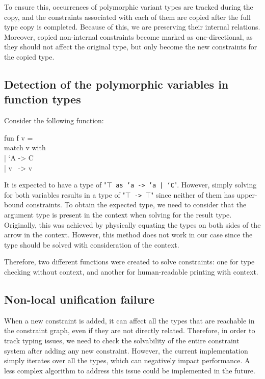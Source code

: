 \documentclass[a4paper,11pt,oneside]{article}
\theoremstyle{definition}
\begin{document}
To ensure this, occurrences of polymorphic variant types are tracked during
the copy, and the constraints associated with each of them are copied after
the full type copy is completed. Because of this, we are preserving their
internal relations. Moreover, copied non-internal constraints become marked
as one-directional, as they should not affect the original type, but only
become the new constraints for the copied type.

\subsection{Detection of the polymorphic variables in function types}

Consider the following function:

{\ttfamily
fun f v =\\
match v with\\
| `A -> C\\
| v \ -> v
}

It is expected to have a type of "\texttt{$\top$ as 'a -> 'a | `C}".
However, simply solving for both variables results in a type of
"\texttt{$\top$ -> $\top$}" since neither of them has upper-bound constraints.
To obtain the expected type, we need to consider that the argument type is
present in the context when solving for the result type. Originally, this was
achieved by physically equating the types on both sides of the arrow in the
context. However, this method does not work in our case since the type should
be solved with consideration of the context.

Therefore, two different functions were created to solve constraints: one for
type checking without context, and another for human-readable printing with
context.


\subsection{Non-local unification failure}

When a new constraint is added, it can affect all the types that are reachable
in the constraint graph, even if they are not directly related. Therefore, in
order to track typing issues, we need to check the solvability of the entire
constraint system after adding any new constraint. However, the current
implementation simply iterates over all the types, which can negatively
impact performance. A less complex algorithm to address this issue could be
implemented in the future.
\end{document}

